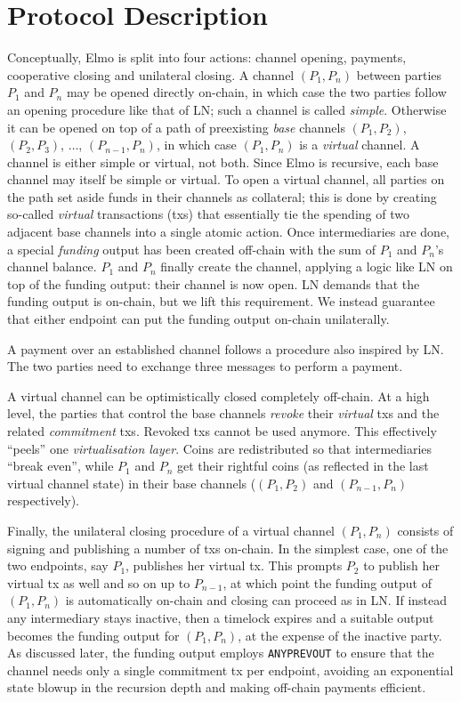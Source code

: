 \section{Protocol Description}
  Conceptually, Elmo is split into four actions: channel opening,
  payments, cooperative closing and unilateral closing. A channel $(P_1, P_n)$
  between parties $P_1$ and $P_n$
  may be opened directly on-chain, in which case the two parties follow an
  opening procedure like that of LN; such a channel is called
  \emph{simple}.
  Otherwise it can be opened on top of a path
  of preexisting \emph{base} channels $(P_1, P_2)$, $(P_2, P_3)$, $\dots$,
  $(P_{n-1}, P_{n})$, in which case $(P_1, P_n)$ is a \emph{virtual}
  channel. A channel is either simple or virtual, not both. Since Elmo is
  recursive, each base channel may itself be simple or
  virtual. To open a virtual
  channel, all parties on the
  path set aside funds in their channels as
  collateral; this is done
  by creating so-called \emph{virtual} transactions (txs) that essentially
  tie the spending of two adjacent base channels into a single atomic action.
  Once intermediaries are done, a special \emph{funding} output has been
  created off-chain with the sum of $P_1$ and $P_n$'s channel
  balance. $P_1$ and $P_n$
  finally create the channel, applying a logic like LN on top of
  the funding output: their channel is now open. LN demands that the funding
  output is on-chain, but we lift this requirement. We instead guarantee that
  either endpoint can put the funding output on-chain unilaterally.

  A payment over an established channel follows a procedure also inspired by
  LN.
  The two parties need to exchange three messages to perform a payment.

  A virtual channel can be optimistically closed completely off-chain. At a high
  level, the parties that control the base channels \emph{revoke} their \emph{virtual}
  txs and the related \emph{commitment} txs. Revoked txs
  cannot be used anymore. This effectively ``peels'' one \emph{virtualisation
  layer}.
  Coins are redistributed so that intermediaries ``break even'', while $P_1$
  and $P_n$ get their rightful coins (as reflected in the last virtual channel
  state) in their base channels ($(P_1, P_2)$ and $(P_{n-1}, P_n)$
  respectively).

  Finally, the unilateral closing procedure of a virtual channel $(P_1, P_n)$
  consists of signing and publishing a number of
  txs on-chain. In the simplest case, one of the two endpoints, say
  $P_1$, publishes her virtual tx. This prompts $P_2$ to publish her
  virtual tx as well and so on up to $P_{n-1}$, at which point the
  funding output of $(P_1, P_n)$ is automatically on-chain and closing can
  proceed as in LN. If instead any intermediary stays inactive, then a timelock
  expires and a suitable output becomes the funding output for $(P_1, P_n)$, at
  the expense of the inactive party. As discussed later, the funding output
  employs \texttt{ANYPREVOUT} to ensure that the channel needs only a
  single commitment tx per endpoint, avoiding an exponential state blowup in the
  recursion depth and making off-chain payments efficient.


